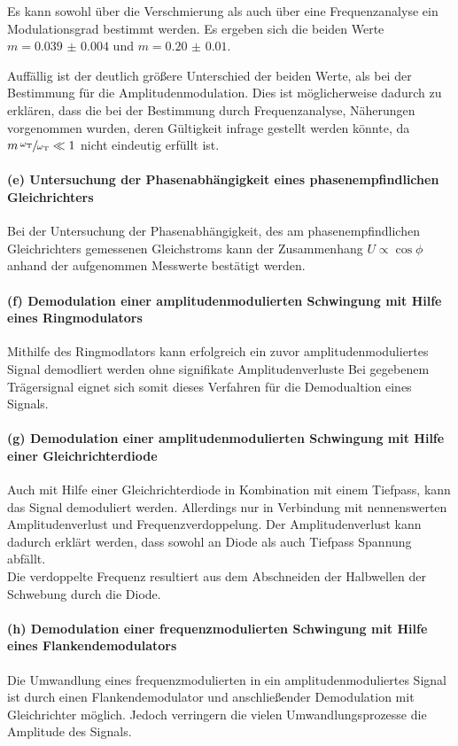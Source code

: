 Es kann sowohl über
die Verschmierung als auch über eine Frequenzanalyse
ein Modulationsgrad bestimmt werden.
Es ergeben sich die beiden Werte
$m = \num{0.039(4)}$ und
$m=\num{0.20(1)}$.

Auffällig ist der deutlich größere Unterschied der beiden Werte,
als bei der Bestimmung für die Amplitudenmodulation.
Dies ist möglicherweise dadurch zu erklären, dass
die bei der Bestimmung durch Frequenzanalyse, Näherungen vorgenommen
wurden, deren Gültigkeit infrage gestellt werden könnte, da
$m \, \sfrac{\omega_{\text{T}}}{\omega_{\text{T}}}\ll1$
nicht eindeutig erfüllt ist.

\paragraph{(e) Untersuchung der Phasenabhängigkeit eines
phasenempfindlichen Gleichrichters}
Bei der Untersuchung der Phasenabhängigkeit, des am phasenempfindlichen
Gleichrichters gemessenen Gleichstroms kann der Zusammenhang $U \propto \cos \phi$ anhand der
aufgenommen Messwerte bestätigt werden.

\paragraph{(f) Demodulation einer amplitudenmodulierten Schwingung
mit Hilfe eines Ringmodulators}
Mithilfe des Ringmodlators kann erfolgreich
ein zuvor amplitudenmoduliertes Signal
demodliert werden ohne signifikate Amplitudenverluste
Bei gegebenem Trägersignal eignet sich somit dieses Verfahren für die
Demodualtion eines Signals.

\paragraph{(g) Demodulation einer amplitudenmodulierten Schwingung
mit Hilfe einer Gleichrichterdiode}
Auch mit Hilfe einer Gleichrichterdiode in Kombination mit einem
Tiefpass, kann das Signal demoduliert werden.
Allerdings nur in Verbindung mit nennenswerten
Amplitudenverlust und Frequenzverdoppelung.
Der Amplitudenverlust kann dadurch erklärt werden, dass sowohl
an Diode als auch Tiefpass Spannung abfällt.\\
Die verdoppelte Frequenz resultiert aus dem Abschneiden
der Halbwellen der Schwebung durch die Diode.
\paragraph{(h) Demodulation einer frequenzmodulierten Schwingung
mit Hilfe eines Flankendemodulators}
Die Umwandlung eines frequenzmodulierten in ein
amplitudenmoduliertes Signal ist durch einen Flankendemodulator
und anschließender Demodulation mit Gleichrichter
möglich. Jedoch verringern die
vielen Umwandlungsprozesse die Amplitude des Signals.

